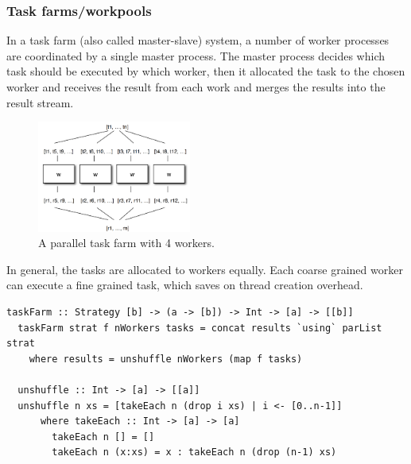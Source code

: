 \documentclass[CS4204-Notes.tex]{subfiles}
\begin{document}
\subsubsection{Task farms/workpools}
In a task farm (also called master-slave) system, a number of worker processes are coordinated by a single master process. The master process decides which task should be executed by which worker, then it allocated the task to the chosen worker and receives the result from each work and merges the results into the result stream.
\begin{figure}[H]
  \centering
  \includegraphics[width=0.45\textwidth, keepaspectratio]{imgs/taskfarm.png}
  \caption{A parallel task farm with 4 workers.}
\end{figure}
\noindent
In general, the tasks are allocated to workers equally. Each coarse grained worker can execute a fine grained task, which saves on thread creation overhead.
\begin{lstlisting}[caption={General parallel task farm implementation.}]
  taskFarm :: Strategy [b] -> (a -> [b]) -> Int -> [a] -> [[b]]
  taskFarm strat f nWorkers tasks = concat results `using` parList strat
    where results = unshuffle nWorkers (map f tasks)

  unshuffle :: Int -> [a] -> [[a]]
  unshuffle n xs = [takeEach n (drop i xs) | i <- [0..n-1]]
      where takeEach :: Int -> [a] -> [a]
        takeEach n [] = []
        takeEach n (x:xs) = x : takeEach n (drop (n-1) xs)
\end{lstlisting}
\end{document}
